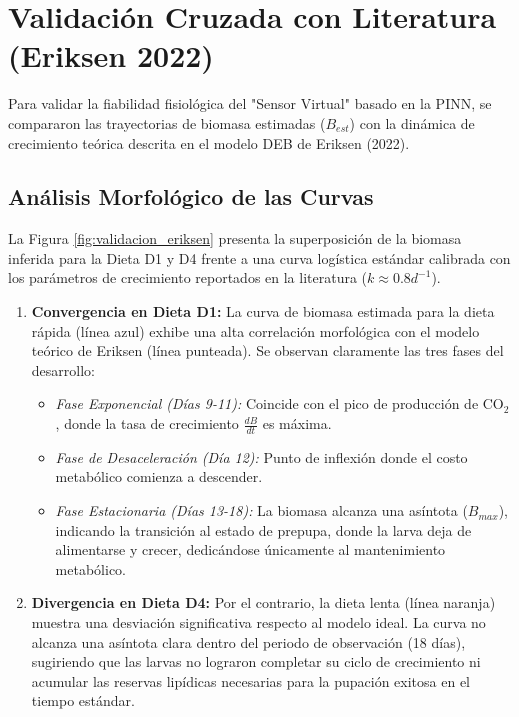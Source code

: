 \section{Validación Cruzada con Literatura (Eriksen 2022)}

Para validar la fiabilidad fisiológica del "Sensor Virtual" basado en la PINN, se compararon las trayectorias de biomasa estimadas ($B_{est}$) con la dinámica de crecimiento teórica descrita en el modelo DEB de Eriksen (2022).

\subsection{Análisis Morfológico de las Curvas}

La Figura \ref{fig:validacion_eriksen} presenta la superposición de la biomasa inferida para la Dieta D1 y D4 frente a una curva logística estándar calibrada con los parámetros de crecimiento reportados en la literatura ($k \approx 0.8 d^{-1}$).

\begin{enumerate}
    \item \textbf{Convergencia en Dieta D1:} La curva de biomasa estimada para la dieta rápida (línea azul) exhibe una alta correlación morfológica con el modelo teórico de Eriksen (línea punteada). Se observan claramente las tres fases del desarrollo:
    \begin{itemize}
        \item \textit{Fase Exponencial (Días 9-11):} Coincide con el pico de producción de CO$_2$, donde la tasa de crecimiento $\frac{dB}{dt}$ es máxima.
        \item \textit{Fase de Desaceleración (Día 12):} Punto de inflexión donde el costo metabólico comienza a descender.
        \item \textit{Fase Estacionaria (Días 13-18):} La biomasa alcanza una asíntota ($B_{max}$), indicando la transición al estado de prepupa, donde la larva deja de alimentarse y crecer, dedicándose únicamente al mantenimiento metabólico.
    \end{itemize}
    
    \item \textbf{Divergencia en Dieta D4:} Por el contrario, la dieta lenta (línea naranja) muestra una desviación significativa respecto al modelo ideal. La curva no alcanza una asíntota clara dentro del periodo de observación (18 días), sugiriendo que las larvas no lograron completar su ciclo de crecimiento ni acumular las reservas lipídicas necesarias para la pupación exitosa en el tiempo estándar.
\end{enumerate}

